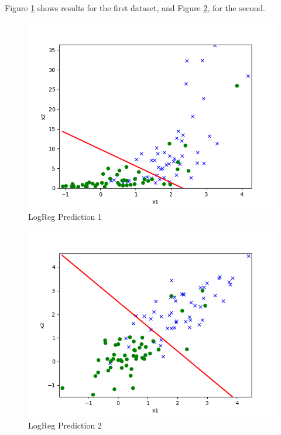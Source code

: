 \begin{answer}

Figure \ref{fig:logreg1} shows results for the first dataset, and Figure \ref{fig:logreg2}, for the second.
\begin{figure}
    \centering
    \includegraphics[width=0.75\linewidth]{ps1/tex/img/logreg_pred_1.png}
    \caption{LogReg Prediction 1}
    \label{fig:logreg1}
\end{figure}
\begin{figure}
    \centering
    \includegraphics[width=0.75\linewidth]{ps1/tex/img/logreg_pred_2.png}
    \caption{LogReg Prediction 2}
    \label{fig:logreg2}
\end{figure}
\end{answer}
